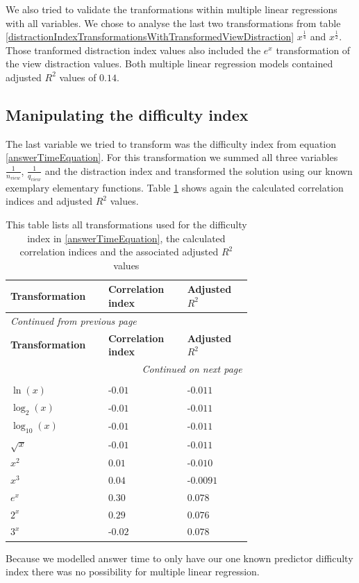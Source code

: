 We also tried to validate the tranformations within multiple linear regressions with all variables. We chose to analyse the last two transformations
from table \ref{distractionIndexTransformationsWithTransformedViewDistraction} $x^{\frac{1}{4}}$ and $x^{\frac{1}{2}}$. Those tranformed distraction index values
also included the $e^x$ transformation of the view distraction values. Both multiple linear regression models contained adjusted $R^2$ values of $0.14$.

\subsection{Manipulating the difficulty index}
The last variable we tried to transform was the difficulty index from equation \ref{answerTimeEquation}. For this transformation we summed all three variables
$\frac{1}{n_{view}}$, $\frac{1}{q_{view}}$ and the distraction index and transformed the solution using our known exemplary elementary functions. Table
\ref{difficultyIndexTransformations} shows again the calculated correlation indices and adjusted $R^2$ values.
\begin{longtable}{| p{0.24\linewidth} | p{0.25\linewidth} | p{0.20\linewidth}|}
    \hline
    \textbf{Transformation} & \textbf{Correlation index} & \textbf{Adjusted $R^2$} \\
    \hline
    \endfirsthead
    \multicolumn{3}{l}{{\textit{Continued from previous page}}} \\
    \hline
    \textbf{Transformation} & \textbf{Correlation index} & \textbf{Adjusted $R^2$} \\
    \hline
    \endhead
    \hline \multicolumn{3}{r}{{\textit{Continued on next page}}} \\
    \endfoot
    \hline
    \caption{This table lists all transformations used for the difficulty index in \ref{answerTimeEquation}, the calculated correlation indices and the associated adjusted $R^2$ values \label{difficultyIndexTransformations}}\\
    \endlastfoot
    $ \ln(x) $ & -$0.01$ & -$0.011$ \\
    \hline
    $ \log_{2}(x) $ & -$0.01$ & -$0.011$ \\
    \hline
    $ \log_{10}(x) $ & -$0.01$ & -$0.011$ \\
    \hline
    $ \sqrt{x} $ & -$0.01$ & -$0.011$ \\
    \hline
    $ x^2 $ & $0.01$ & -$0.010$ \\
    \hline
    $ x^3 $ & $0.04$ & -$0.0091$ \\
    \hline
    $ e^x $ & $0.30$ & $0.078$ \\
    \hline
    $ 2^x $ & $0.29$ & $0.076$ \\
    \hline
    $ 3^x $ & -$0.02$ & $0.078$ \\
\end{longtable}
Because we modelled answer time to only have our one known predictor difficulty index there was no possibility for multiple linear
regression.
